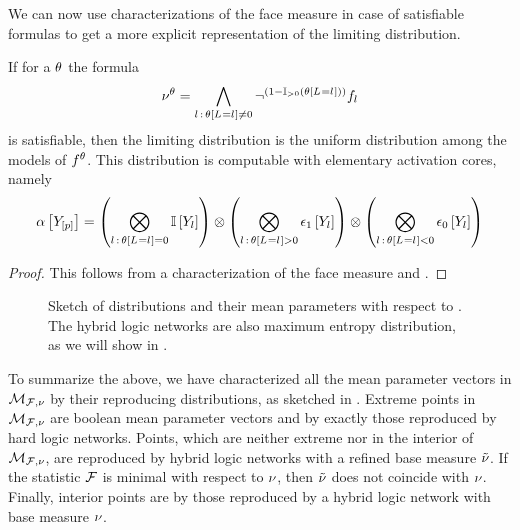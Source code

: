 We can now use characterizations of the face measure in case of satisfiable formulas to get a more explicit representation of the limiting distribution.

\begin{theorem}
    If for a $\theta$ the formula
    \begin{align*}
        \nu^{\theta}
        = \bigwedge_{l\,:\,\theta\left[L_{}=l_{}\right]\neq0} \lnot^{(1-\mathbb{I}_{>0}\left(\theta\left[L_{}=l_{}\right]\right))} f_{l}
    \end{align*}
    is satisfiable, then the limiting distribution is the uniform distribution among the models of $f^{\theta}$.
    This distribution is computable with elementary activation cores, namely
    \begin{align*}
        \alpha\left[Y_{[p]}\right]
        = \left(\bigotimes_{l\,:\,\theta\left[L_{}=l_{}\right]=0} \mathbb{I}\left[Y_{l}\right]\right)
        \otimes \left(\bigotimes_{l\,:\,\theta\left[L_{}=l_{}\right]>0} \epsilon_1\left[Y_{l}\right]\right)
        \otimes \left(\bigotimes_{l\,:\,\theta\left[L_{}=l_{}\right]<0} \epsilon_0\left[Y_{l}\right]\right)
    \end{align*}
\end{theorem}
\begin{proof}
    This follows from a characterization of the face measure and .
\end{proof}



\begin{figure}[h]
    \begin{center}
        
    \end{center}
    \caption{Sketch of distributions and their mean parameters with respect to .
    The hybrid logic networks are also maximum entropy distribution, as we will show in .}
    \label{fig:reproducableSketch}
\end{figure}


To summarize the above, we have characterized all the mean parameter vectors in $\mathcal{M}_{\mathcal{F},\nu}$ by their reproducing distributions, as sketched in .
Extreme points in $\mathcal{M}_{\mathcal{F},\nu}$ are boolean mean parameter vectors and by  exactly those reproduced by hard logic networks.
Points, which are neither extreme nor in the interior of $\mathcal{M}_{\mathcal{F},\nu}$, are reproduced by hybrid logic networks with a refined base measure $\tilde{\nu}$. %
If the statistic $\mathcal{F}$ is minimal with respect to $\nu$, then $\tilde{\nu}$ does not coincide with $\nu$.
Finally, interior points are by  those reproduced by a hybrid logic network with base measure $\nu$.

